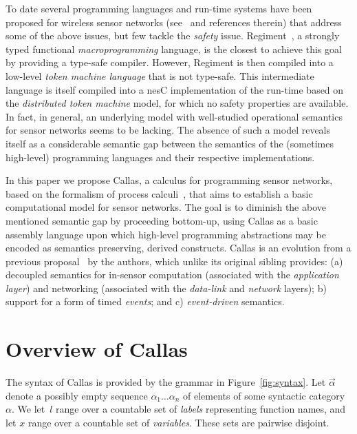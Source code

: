 \documentclass[copyright,creativecommons]{eptcs}
\begin{document}
To date several programming languages and run-time systems have been
proposed for wireless sensor networks (see~\cite{bookchapter} and
references therein) that address some of the above issues, but few
tackle the \emph{safety} issue. Regiment~\cite{regiment2}, a strongly
typed functional \emph{macroprogramming} language, is the closest to
achieve this goal by providing a type-safe compiler.
However, Regiment is then compiled into a low-level \emph{token
 machine language} that is not type-safe. This intermediate language
is itself compiled into a nesC implementation of the run-time based on
the \emph{distributed token machine} model, for which no safety
properties are available.
In fact, in general, an underlying model with well-studied operational
semantics for sensor networks seems to be lacking. The absence of such
a model reveals itself as a considerable semantic gap between the
semantics of the (sometimes high-level) programming languages and their
respective implementations.

In this paper we propose Callas, a calculus for programming sensor
networks, based on the formalism of process
calculi~\cite{async-pi:honda:tokoro:91,pi:milner:parrow:walker:92},
that aims to establish a basic computational model for sensor
networks. The goal is to diminish the above mentioned semantic gap
by proceeding bottom-up, using Callas as a basic assembly language
upon which high-level programming abstractions may be encoded as
semantics preserving, derived constructs.
Callas is an evolution from a previous proposal~\cite{sensorcomm07} by
the authors, which unlike its original sibling  provides: (a)
decoupled semantics for in-sensor computation (associated with the
\emph{application layer}) and networking (associated with the
\emph{data-link} and \emph{network} layers); b) support for a form of
timed \emph{events}; and c) \emph{event-driven} semantics.






\section{Overview of Callas}
\label{sec:calculus}

The syntax of Callas is provided by the grammar in
Figure~\ref{fig:syntax}. Let $\vec \alpha$ denote a possibly empty
sequence $\alpha_1 \dots \alpha_n$ of elements of some syntactic
category $\alpha$. We let~$l$ range over a countable set of
\emph{labels} representing function names, and let $x$ range
over a countable set of \emph{variables}. These sets are pairwise
disjoint.
\end{document}

